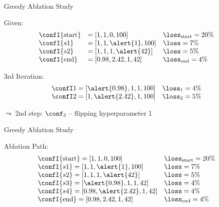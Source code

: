 \begin{frame}[c]{Greedy Ablation Study}

Given:
\begin{eqnarray}
\begin{array}{lll}
\confI{\text{start}} &= [1, 1, 0, 100] & \loss_{\text{start}} = 20\% \nonumber\\
\confI{s1} &= [1, 1, \alert{1}, 100]  & \loss = 7\% \nonumber\\
\confI{s2} &= [1, 1, 1, \alert{42}]  & \loss = 5\% \nonumber\\
\confI{\text{end}} &= [0.98, 2.42, 1, 42]  & \loss_{\text{end}} = 4\% \nonumber
\end{array}
\end{eqnarray}

3rd Iteration:
\begin{eqnarray}
\begin{array}{ll}
\confI1 = [\alert{0.98}, 1, 1, 100] & \loss_1 = 4\% \nonumber\\
\confI2 = [1, \alert{2.42}, 1, 100] & \loss_2 = 5\% \nonumber\\
\end{array}
\end{eqnarray}

$\leadsto$ 2nd step: $\conf_3$ -- flipping hyperparameter 1

\end{frame}
\begin{frame}[c]{Greedy Ablation Study}

Ablation Path:
\begin{eqnarray}
\begin{array}{ll}
\confI{\text{start}} = [1, 1, 0, 100] & \loss_{\text{start}} = 20\% \nonumber\\
\confI{s1} = [1, 1, \alert{1}, 100]  & \loss = 7\% \nonumber\\
\confI{s2} = [1, 1, 1, \alert{42}]  & \loss = 5\% \nonumber\\
\confI{s3} = [\alert{0.98}, 1, 1, 42] & \loss = 4\% \nonumber\\
\confI{s4} = [0.98, \alert{2.42}, 1, 42] & \loss = 4\% \nonumber\\
\confI{\text{end}} = [0.98, 2.42, 1, 42]  & \loss_{\text{end}} = 4\% \nonumber
\end{array}
\end{eqnarray}

\end{frame}
